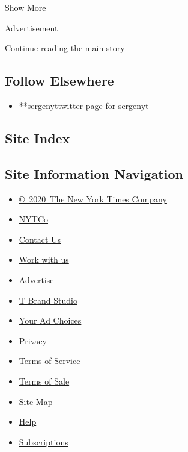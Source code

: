 Show More

Advertisement

\protect\hyperlink{after-mid2}{Continue reading the main story}

\hypertarget{follow-elsewhere}{%
\subsection{Follow Elsewhere}\label{follow-elsewhere}}

\begin{itemize}
\tightlist
\item
  \href{https://twitter.com/sergenyt}{**sergenyttwitter page for
  sergenyt}
\end{itemize}

\hypertarget{site-index}{%
\subsection{Site Index}\label{site-index}}

\hypertarget{site-information-navigation}{%
\subsection{Site Information
Navigation}\label{site-information-navigation}}

\begin{itemize}
\tightlist
\item
  \href{https://help.nytimes3xbfgragh.onion/hc/en-us/articles/115014792127-Copyright-notice}{©~2020~The
  New York Times Company}
\end{itemize}

\begin{itemize}
\tightlist
\item
  \href{https://www.nytco.com/}{NYTCo}
\item
  \href{https://help.nytimes3xbfgragh.onion/hc/en-us/articles/115015385887-Contact-Us}{Contact
  Us}
\item
  \href{https://www.nytco.com/careers/}{Work with us}
\item
  \href{https://nytmediakit.com/}{Advertise}
\item
  \href{http://www.tbrandstudio.com/}{T Brand Studio}
\item
  \href{https://www.nytimes3xbfgragh.onion/privacy/cookie-policy\#how-do-i-manage-trackers}{Your
  Ad Choices}
\item
  \href{https://www.nytimes3xbfgragh.onion/privacy}{Privacy}
\item
  \href{https://help.nytimes3xbfgragh.onion/hc/en-us/articles/115014893428-Terms-of-service}{Terms
  of Service}
\item
  \href{https://help.nytimes3xbfgragh.onion/hc/en-us/articles/115014893968-Terms-of-sale}{Terms
  of Sale}
\item
  \href{https://spiderbites.nytimes3xbfgragh.onion}{Site Map}
\item
  \href{https://help.nytimes3xbfgragh.onion/hc/en-us}{Help}
\item
  \href{https://www.nytimes3xbfgragh.onion/subscription?campaignId=37WXW}{Subscriptions}
\end{itemize}

